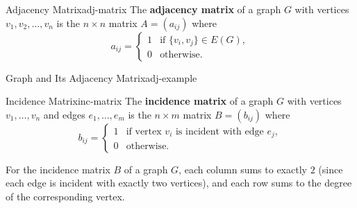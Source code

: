 \documentclass[11pt,a4paper]{scrartcl}
\begin{document}
\begin{definition}{Adjacency Matrix}{adj-matrix}
The \textbf{adjacency matrix} of a graph $G$ with vertices $v_1, v_2, \ldots, v_n$ is the $n \times n$ matrix $A = (a_{ij})$ where
\[
  a_{ij} = \begin{cases}
    1 & \text{if } \{v_i, v_j\} \in E(G), \\
    0 & \text{otherwise.}
  \end{cases}
\]
\end{definition}

\begin{example}{Graph and Its Adjacency Matrix}{adj-example}
~

\begin{center}
\end{center}
\end{example}

\begin{definition}{Incidence Matrix}{inc-matrix}
The \textbf{incidence matrix} of a graph $G$ with vertices $v_1, \ldots, v_n$ and edges $e_1, \ldots, e_m$ is the $n \times m$ matrix $B = (b_{ij})$ where
\[
  b_{ij} = \begin{cases}
    1 & \text{if vertex } v_i \text{ is incident with edge } e_j, \\
    0 & \text{otherwise.}
  \end{cases}
\]
\end{definition}

\begin{notebox}
For the incidence matrix $B$ of a graph $G$, each column sums to exactly $2$ (since each edge is incident with exactly two vertices), and each row sums to the degree of the corresponding vertex.
\end{notebox}
\end{document}
